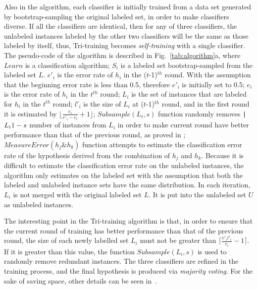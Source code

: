 \documentclass[english]{jnlp_1.4}
\begin{document}
Also in the algorithm, each classifier is initially  trained from
a data set generated by bootstrap-sampling the original labeled
set, in order to make classifiers diverse. If all the classifiers
are identical, then for any of three classifiers, the unlabeled
instances labeled by the other two classifiers will be the same as
those labeled by itself, thus, Tri-training becomes
\emph{self-training} with a single classifier. The pseudo-code of
the algorithm is described in Fig.~\ref{tab:algorithm}a, where
$Learn$ is a classification algorithm; $S_{i}$ is a labeled set
bootstrap-sampled from the labeled set $L$. $e'_{i}$ is the error
rate of $h_{i}$ in the ($t$-1)$^{th}$ round. With the assumption
that the beginning error rate is less than 0.5, therefore $e'_{i}$
is initially set to 0.5; $e_{i}$ is the error rate of $h_{i}$ in
the $t^{th}$ round; $L_{i}$ is the set of instances that are
labeled for $h_{i}$ in the $t^{th}$ round; $l'_{i}$ is the size of
$L_{i}$ at ($t$-1)$^{th}$ round, and in the first round it is
estimated by $\lfloor \frac{e_{i}}{e'_{i}-e_{i}}+1 \rfloor$;
$Subsample(L_{i},s)$ function randomly removes
\verb"|"$L_{i}\verb"|"-s$ number of instances from $L_{i}$ in
order to make current round have better performance than that of
the previous round, as proved in \cite{Zhi05};
$MeasureError(h_{j}\&h_{k})$ function attempts to estimate the
classification error rate of the hypothesis derived from the
combination of $h_{j}$ and $h_{k}$. Because it is difficult to
estimate the classification error rate on the unlabeled instances,
the algorithm only estimates on the labeled set with the
assumption that both the labeled and unlabeled instance sets have
the same distribution. In each iteration, $L_{i}$ is not merged
with the original labeled set $L$. It is put into the unlabeled
set $U$ as unlabeled instances.

The interesting point in the Tri-training algorithm is that, in
order to ensure that the current round of training has better
performance than that of the previous round, the size of each
newly labelled set $L_{i}$ must not be greater than
$\lceil\frac{e'_{i}l'_{i}}{e_{i}}-1\rceil$. If it is greater than
this value, the function $Subsample(L_{i},s)$ is used to randomly
remove redundant instances. The three classifiers are refined in
the training process, and the final hypothesis is produced via
\emph{majority voting}. For the sake of saving space, other
details can be seen in~\cite{Zhi05}.
\end{document}
